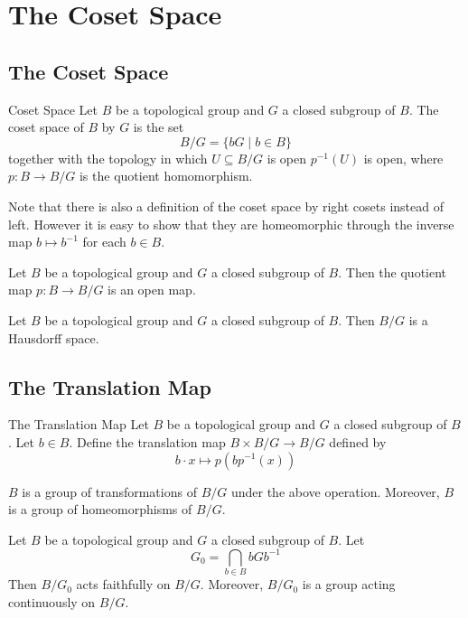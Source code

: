 \documentclass[a4paper]{article}
\begin{document}
\pagebreak
\section{The Coset Space}
\subsection{The Coset Space}
\begin{defn}{Coset Space}{} Let $B$ be a topological group and $G$ a closed subgroup of $B$. The coset space of $B$ by $G$ is the set $$B/G=\{bG\;|\;b\in B\}$$ together with the topology in which $U\subseteq B/G$ is open $p^{-1}(U)$ is open, where $p:B\to B/G$ is the quotient homomorphism. 
\end{defn}

Note that there is also a definition of the coset space by right cosets instead of left. However it is easy to show that they are homeomorphic through the inverse map $b\mapsto b^{-1}$ for each $b\in B$. 

\begin{prp}{}{} Let $B$ be a topological group and $G$ a closed subgroup of $B$. Then the quotient map $p:B\to B/G$ is an open map. 
\end{prp}

\begin{prp}{}{} Let $B$ be a topological group and $G$ a closed subgroup of $B$. Then $B/G$ is a Hausdorff space. 
\end{prp}

\subsection{The Translation Map}
\begin{defn}{The Translation Map}{} Let $B$ be a topological group and $G$ a closed subgroup of $B$. Let $b\in B$. Define the translation map $B\times B/G\to B/G$ defined by $$b\cdot x\mapsto p(bp^{-1}(x))$$
\end{defn}

\begin{prp}{}{} $B$ is a group of transformations of $B/G$ under the above operation. Moreover, $B$ is a group of homeomorphisms of $B/G$. 
\end{prp}

\begin{prp}{}{} Let $B$ be a topological group and $G$ a closed subgroup of $B$. Let $$G_0=\bigcap_{b\in B}bGb^{-1}$$ Then $B/G_0$ acts faithfully on $B/G$. Moreover, $B/G_0$ is a group acting continuously on $B/G$. 
\end{prp}
\end{document}
